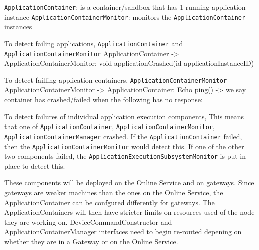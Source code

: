         \texttt{ApplicationContainer}: is a container/sandbox that has 1 running application instance
        \texttt{ApplicationContainerMonitor}: monitors the \texttt{ApplicationContainer} instances

        To detect failing applications, \texttt{ApplicationContainer} and \texttt{ApplicationContainerMonitor}
            ApplicationContainer -> ApplicationContainerMonitor: void applicationCrashed(id applicationInstanceID)

        To detect failling application containers, \texttt{ApplicationContainerMonitor}
            ApplicationContainerMonitor -> ApplicationContainer: Echo ping()
            -> we say container has crashed/failed when the following has no response:

        To detect failures of individual application execution components,
        This means that one of \texttt{ApplicationContainer}, \texttt{ApplicationContainerMonitor}, \texttt{ApplicationContainerManager} crashed.
        If the \texttt{ApplicationContainer} failed, then the \texttt{ApplicationContainerMonitor} would detect this.
        If one of the other two components failed, the \texttt{ApplicationExecutionSubsystemMonitor} is put in place to detect this.

        These components will be deployed on the Online Service and on gateways.
        Since gateways are weaker machines than the ones on the Online Service,
        the ApplicationContainer can be confgured differently for gateways.
        The ApplicationContainers will then have stricter limits on
        resources used of the node they are working on.
        DeviceCommandConstructor and ApplicationContainerManager interfaces need to begin
        re-routed depening on whether they are in a Gateway or on the Online Service.


